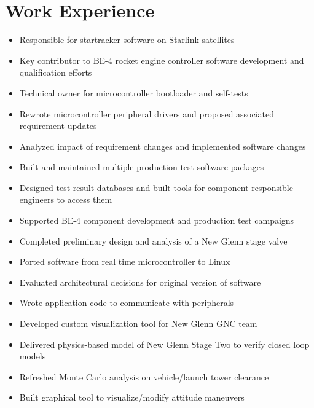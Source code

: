 \documentclass{resume}
\begin{document}

\section{Work Experience}
\begin{itemize}
    \item Responsible for startracker software on Starlink satellites
\end{itemize}
\begin{itemize}
    \item Key contributor to BE-4 rocket engine controller software development and qualification efforts
    \item Technical owner for microcontroller bootloader and self-tests
    \item Rewrote microcontroller peripheral drivers and proposed associated requirement updates
    \item Analyzed impact of requirement changes and implemented software changes
\end{itemize}
\begin{itemize}
    \item Built and maintained multiple production test software packages
    \item Designed test result databases and built tools for component responsible engineers to access them
    \item Supported BE-4 component development and production test campaigns
    \item Completed preliminary design and analysis of a New Glenn stage valve
\end{itemize}
\begin{itemize}
    \item Ported software from real time microcontroller to Linux
    \item Evaluated architectural decisions for original version of software
    \item Wrote application code to communicate with peripherals
    \item Developed custom visualization tool for New Glenn GNC team
    \item Delivered physics-based model of New Glenn Stage Two to verify closed loop models
    \item Refreshed Monte Carlo analysis on vehicle/launch tower clearance
    \item Built graphical tool to visualize/modify attitude maneuvers
\end{itemize}
\end{document}
